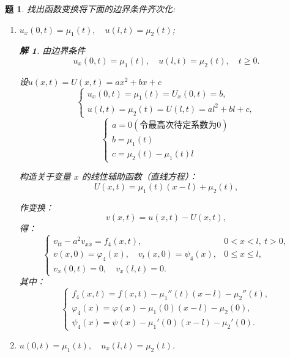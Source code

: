\documentclass[12pt,a4paper]{article}
\newtheorem{problem}{题}
\newtheorem*{solution}{解}
\begin{document}
\begin{problem}

 找出函数变换将下面的边界条件齐次化:
	\begin{enumerate}
		\item $u_x(0,t) = \mu_1(t), \quad u(l,t) = \mu_2(t)$;
	\begin{solution}
	由边界条件
	\begin{equation}
		u_x(0,t) = \mu_1(t), \quad u(l,t) = \mu_2(t), \quad t \geq 0.
	\end{equation}
	
	设$u(x, t)=U(x, t)=ax^2+bx+c$
	\[
	\begin{cases}
		u_x(0, t) = \mu_1(t) = U_x(0, t) = b, \\
		u(l, t) = \mu_2(t) = U(l, t) = al^2 + bl+c,
	\end{cases}
	\]
	\[
	\begin{cases}
		a = 0 (\text{令最高次待定系数为0})\\
		b =\mu_1(t) \\
		c = \mu_2(t)-\mu_1(t)l
	\end{cases}
	\]
	
构造关于变量 \(x\) 的线性辅助函数（直线方程）：
	\begin{equation}
		U(x, t) = \mu_1(t)(x-l) + \mu_2(t) ,
	\end{equation}
	
	作变换：
	\begin{equation}
		v(x, t) = u(x, t) - U(x, t),
	\end{equation}
	得：
	\begin{equation}
		\begin{cases}
			v_{tt} - a^2 v_{xx} = f_4(x, t), & 0 < x < l, \ t > 0, \\
			v(x, 0) = \varphi_4(x), \quad v_t(x, 0) = \psi_4(x), & 0 \leq x \leq l, \\
			v_x(0, t) = 0, \quad v_x(l, t) = 0. &
		\end{cases}
	\end{equation}
	其中：
	\begin{equation}
		\begin{cases}
			f_4(x, t) = f(x, t) - \mu_1''(t) (x-l)- \mu_2''(t) , \\
			\varphi_4(x) = \varphi(x) - \mu_1(0)(x-l)- \mu_2(0), \\
			\psi_4(x) = \psi(x) - \mu_1'(0)(x-l) - \mu_2'(0).
		\end{cases}
	\end{equation}
	\end{solution}
	
		\item $u(0,t) = \mu_1(t), \quad u_x(l,t) = \mu_2(t)$.
	\end{enumerate}
	
\end{problem}
	
\end{document}
